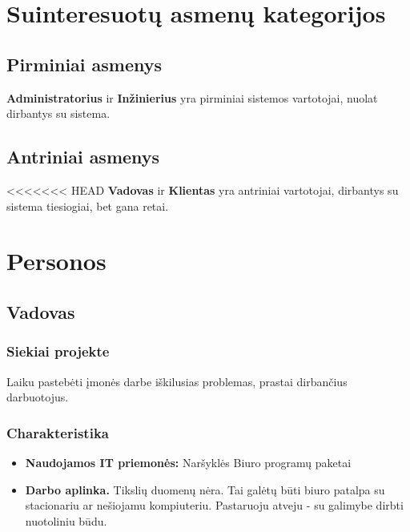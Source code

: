 \section{Suinteresuotų asmenų kategorijos}

	\subsection{Pirminiai asmenys}
	
	\textbf{Administratorius} ir \textbf{Inžinierius} yra pirminiai sistemos vartotojai, nuolat dirbantys su sistema.
	
	\subsection{Antriniai asmenys}
	
<<<<<<< HEAD
	\textbf{Vadovas} ir \textbf{Klientas} yra antriniai vartotojai, dirbantys su sistema tiesiogiai, bet gana retai.

\section{Personos}

	\subsection{Vadovas}
		
		\subsubsection{Siekiai projekte}
		
		Laiku pastebėti įmonės darbe iškilusias problemas, prastai dirbančius darbuotojus.
		
		\subsubsection{Charakteristika}
		
		\begin{itemize}
			\item \textbf{Naudojamos IT priemonės:}
				\subitem Naršyklės
				\subitem Biuro programų paketai
			\item \textbf{Darbo aplinka.} Tikslių duomenų nėra. 
			Tai galėtų būti biuro patalpa su stacionariu ar nešiojamu kompiuteriu.
			Pastaruoju atveju - su galimybe dirbti nuotoliniu būdu.
		\end{itemize}
			
